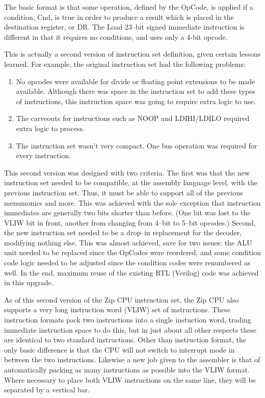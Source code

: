 \documentclass{gqtekspec}
\begin{document}
The basic format is that some operation, defined by the OpCode, is applied
if a condition, Cnd, is true in order to produce a result which is placed in
the destination register, or DR.  The Load 23--bit signed immediate instruction
is different in that it requires no conditions, and uses only a 4-bit opcode.

This is actually a second version of instruction set definition, given certain
lessons learned.  For example, the original instruction set had the following
problems:
\begin{enumerate}
\item No opcodes were available for divide or floating point extensions to be
	made available.  Although there was space in the instruction set to
	add these types of instructions, this instruction space was going to
	require extra logic to use.
\item The carveouts for instructions such as NOOP and LDIHI/LDILO required
	extra logic to process.
\item The instruction set wasn't very compact.  One bus operation was required
	for every instruction.
\end{enumerate}
This second version was designed with two criteria.  The first was that the
new instruction set needed to be compatible, at the assembly language level,
with the previous instruction set.  Thus, it must be able to support all of
the previous menumonics and more.  This was achieved with the sole exception
that instruction immediates are generally two bits shorter than before.
(One bit was lost to the VLIW bit in front, another from changing from 4--bit
to 5--bit opcodes.)  Second, the new instruction set needed to be a drop--in
replacement for the decoder, modifying nothing else.  This was almost achieved,
save for two issues: the ALU unit needed to be replaced since the OpCodes
were reordered, and some condition code logic needed to be adjusted since the
condition codes were renumbered as well.  In the end, maximum reuse of the
existing RTL (Verilog) code was achieved in this upgrade.

As of this second version of the Zip CPU instruction set, the Zip CPU also
supports a very long instruction word (VLIW) set of instructions.   These
instruction formats pack two instructions into a single instuction word,
trading immediate instruction space to do this, but in just about all other
respects these are identical to two standard instructions.  Other than 
instruction format, the only basic difference is that the CPU will not switch
to interrupt mode in between the two instructions.  Likewise a new job given
to the assembler is that of automatically packing as many instructions as
possible into the VLIW format.  Where necessary to place both VLIW instructions
on the same line, they will be separated by a vertical bar.
\end{document}
